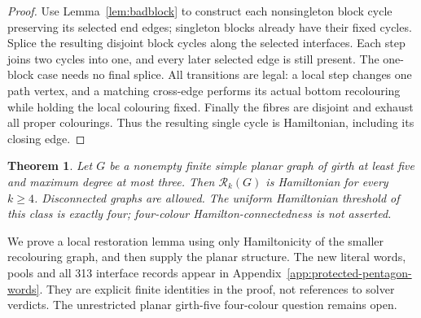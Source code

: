 \documentclass[11pt]{article}
\newtheorem{theorem}{Theorem}[section]
\theoremstyle{remark}
\newcommand{\Rk}{\mathcal R_k}
\numberwithin{equation}{section}
\begin{document}
\begin{proof}
Use Lemma~\ref{lem:badblock} to construct each nonsingleton block
cycle preserving its selected end edges; singleton blocks already
have their fixed cycles. Splice the resulting disjoint block cycles
along the selected interfaces. Each step joins two cycles into one,
and every later selected edge is still present. The one-block case
needs no final splice. All transitions are legal: a local step changes
one path vertex, and a matching cross-edge performs its actual bottom
recolouring while holding the local colouring fixed. Finally the fibres
are disjoint and exhaust all proper colourings. Thus the resulting
single cycle is Hamiltonian, including its closing edge.
\end{proof}



\begin{theorem}\label{thm:subcubic}
Let $G$ be a nonempty finite simple planar graph of girth at least five
and maximum degree at most three. Then $\Rk(G)$ is Hamiltonian for
every $k\ge4$. Disconnected graphs are allowed. The uniform Hamiltonian threshold
of this class is exactly four; four-colour Hamilton-connectedness is not asserted.
\end{theorem}

We prove a local restoration lemma using only Hamiltonicity of the
smaller recolouring graph, and then supply the planar structure.
The new literal words, pools and all 313 interface records appear in
Appendix~\ref{app:protected-pentagon-words}. They are explicit finite
identities in the proof, not references to solver verdicts.
The unrestricted planar girth-five four-colour question remains open.
\end{document}
